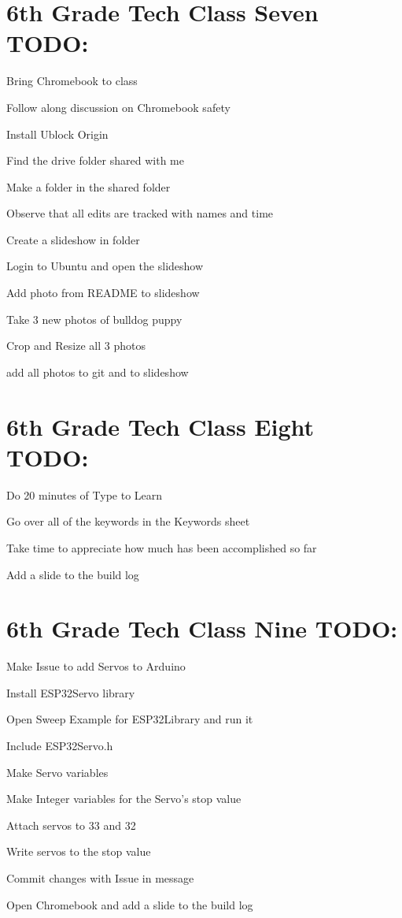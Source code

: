 \documentclass{article}
\begin{document}
\section{6th Grade Tech Class Seven TODO:}
\begin{todolist}
	\item Bring Chromebook to class
	\item Follow along discussion on Chromebook safety
	\item Install Ublock Origin
	\item Find the drive folder shared with me
	\item Make a folder in the shared folder
	\item Observe that all edits are tracked with names and time
	\item Create a slideshow in folder
	\item Login to Ubuntu and open the slideshow
	\item Add photo from README to slideshow
	\item Take 3 new photos of bulldog puppy
	\item Crop and Resize all 3 photos
	\item add all photos to git and to slideshow
\end{todolist}

\section{6th Grade Tech Class Eight TODO:}
\begin{todolist}
	\item Do 20 minutes of Type to Learn
	\item Go over all of the keywords in the Keywords sheet
	\item Take time to appreciate how much has been accomplished so far
	\item Add a slide to the build log
\end{todolist}
\newpage

\section{6th Grade Tech Class Nine TODO:}
\begin{todolist}
	\item Make Issue to add Servos to Arduino
	\item Install ESP32Servo library
	\item Open Sweep Example for ESP32Library and run it
	\item Include ESP32Servo.h
	\item Make Servo variables
	\item Make Integer variables for the Servo's stop value
	\item Attach servos to 33 and 32
	\item Write servos to the stop value
	\item Commit changes with Issue in message
	\item Open Chromebook and add a slide to the build log
\end{todolist}
\end{document}
